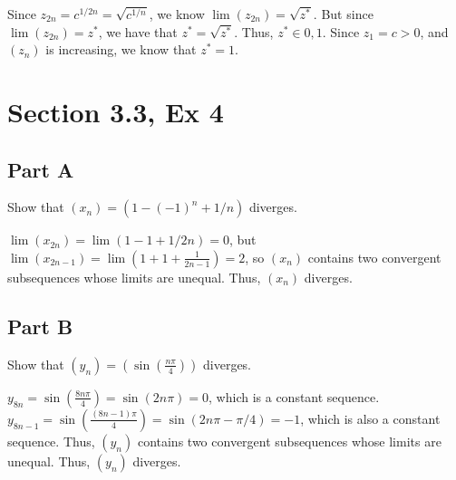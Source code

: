 \documentclass[paper=a4, fontsize=11pt]{scrartcl} %
\numberwithin{equation}{section} %
\numberwithin{figure}{section} %
\numberwithin{table}{section} %
\begin{document}
Since $z_{2n} = c^{1/2n} = \sqrt{c^{1/n}}$, we know $\lim(z_{2n}) = \sqrt{z^*}$. But since $\lim(z_{2n}) = z^*$,  we have that $z^* = \sqrt{z^*}$. Thus, $z^* \in {0,1}$. Since $z_1 = c > 0$, and $(z_n)$ is increasing, we know that $z^* = 1$. \done

\section*{Section 3.3, Ex 4}

\subsection*{Part A}

Show that $(x_n) = (1 - (-1)^n + 1/n)$ diverges.

\pf $\lim(x_{2n}) = \lim(1 - 1 + 1/2n) = 0$, but $\lim(x_{2n - 1}) = \lim(1 + 1 + \frac{1}{2n - 1}) = 2$, so $(x_n)$ contains two convergent subsequences whose limits are unequal. Thus, $(x_n)$ diverges. \done

\subsection*{Part B}

Show that $(y_n) = (\sin(\frac{n\pi}{4}))$ diverges.

\pf $y_{8n} = \sin(\frac{8n\pi}{4}) = \sin(2n\pi) = 0$, which is a constant sequence. $y_{8n-1} = \sin(\frac{(8n - 1)\pi}{4}) = \sin(2n\pi - \pi/4) = -1$, which is also a constant sequence. Thus, $(y_n)$ contains two convergent subsequences whose limits are unequal. Thus, $(y_n)$ diverges. \done
\end{document}
